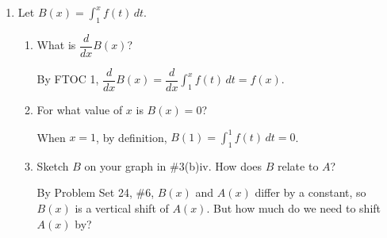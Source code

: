 \documentclass[main]{subfiles}
\begin{document}
\begin{enumerate}[resume]
\begin{enumerate}
  \item


      Let $B(x)=\displaystyle\int_1^x f(t)\,dt$.
      
    \begin{enumerate}
    
    \item
    \begin{problem}[\stretch{0.1}]
        What is $\dfrac{d}{dx} B(x)$?
    \end{problem}

    \begin{solution}
        By FTOC 1, $\dfrac{d}{dx} B(x)
        =\dfrac{d}{dx} \displaystyle \int_1^x f(t)\,dt = f(x)$.
    \end{solution}

    \item
    \begin{problem}[\stretch{0.1}]
        For what value of $x$ is $B(x)=0$?
    \end{problem}

    \begin{solution}
        When $\boxed{x=1}$, by definition, 
        $B(1)=\displaystyle\int_1^1 f(t)\,dt=0$.
    \end{solution}

    \item 
    \begin{problem}[\newpage]
      Sketch $B$ on your graph in {{{{\#3}}(b)iv}}.  How does
      $B$ relate to $A$?
    \end{problem}

    \begin{solution}
      By {{{Problem Set 24}, {{\#6}}}}, $B(x)$ and $
      A(x)$ differ by a constant, so $B(x)$ is a 
      vertical shift of
      $A(x)$.  But how much do we need to shift $A(x)$ by?


\end{solution}
\end{enumerate}
\end{enumerate}
\end{enumerate}
\end{document}

